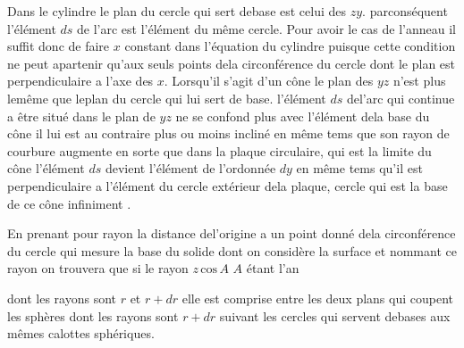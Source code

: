 \documentclass[11pt,a4paper]{article}
\begin{document}
Dans le cylindre le plan du cercle qui sert debase est celui
des $zy$. parconséquent  l'élément $ds$ de l'arc est l'élément
du même cercle. Pour avoir le cas de l'anneau il suffit donc
de faire $x$ constant dans l'équation du cylindre puisque cette
condition ne peut apartenir qu'aux seuls points dela circonférence
du cercle dont le plan est perpendiculaire a l'axe des $x$.
Lorsqu'il s'agit d'un cône le plan des $yz$ n'est plus lemême
que leplan du cercle qui lui sert de base. l'élément $ds$ del'arc
qui continue a être situé dans le plan de $yz$ ne se confond plus
avec l'élément dela base du cône il lui est au contraire
plus ou moins incliné  en même tems
que son rayon de courbure augmente en sorte que dans la plaque
circulaire, qui est la limite du cône l'élément $ds$ devient l'élément
de l'ordonnée $dy$ en même tems qu'il est perpendiculaire a l'élément
du cercle extérieur dela plaque, cercle qui est la base de ce cône
infiniment .

En prenant pour rayon la distance del'origine a un point
donné dela circonférence du cercle qui mesure la base du solide
dont on considère la surface et nommant ce rayon 
on trouvera que si le rayon $z\,\text{cos}\,A$ \quad $A$ étant l'an


dont les rayons sont $r$ et $r + dr$ elle est comprise entre
les deux plans qui coupent les sphères dont les rayons sont
$r + dr$ suivant les cercles qui servent debases aux mêmes
calottes sphériques.
\end{document}
